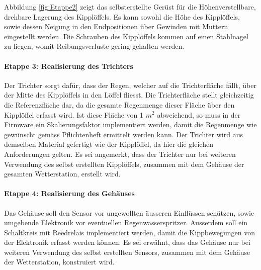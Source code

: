 Abbildung \ref{fig:Etappe2} zeigt das selbsterstellte Gerüst für die Höhenverstellbare, drehbare Lagerung des Kipplöffels. Es kann sowohl die Höhe des Kipplöffels, sowie dessen Neigung in den Endpositionen über Gewinden mit Muttern eingestellt werden. Die Schrauben des Kipplöffels kommen auf einen Stahlnagel zu liegen, womit Reibungsverluste gering gehalten werden.

\paragraph{\textbf{Etappe 3: Realisierung des Trichters}}
Der Trichter sorgt dafür, dass der Regen, welcher auf die Trichterfläche fällt, über der Mitte des Kipplöffels in den Löffel fliesst. Die Trichterfläche stellt gleichzeitig die Referenzfläche dar, da die gesamte Regenmenge dieser Fläche über den Kipplöffel erfasst wird. Ist diese Fläche von 1 $m^2$ abweichend, so muss in der Firmware ein Skalierungsfaktor implementiert werden, damit die Regenmenge wie gewünscht gemäss Pflichtenheft ermittelt werden kann. Der Trichter wird aus demselben Material gefertigt wie der Kipplöffel, da hier die gleichen Anforderungen gelten. Es sei angemerkt, dass der Trichter nur bei weiteren Verwendung des selbst erstellten Kipplöffels, zusammen mit dem Gehäuse der gesamten Wetterstation, erstellt wird.

\paragraph{\textbf{Etappe 4: Realisierung des Gehäuses}}
Das Gehäuse soll den Sensor vor ungewollten äusseren Einflüssen schützen, sowie umgebende Elektronik vor eventuellen Regenwasserspritzer. Ausserdem soll ein Schaltkreis mit Reedrelais implementiert werden, damit die Kippbewegungen von der Elektronik erfasst werden können. Es sei erwähnt, dass das Gehäuse nur bei weiteren Verwendung des selbst erstellten Sensors, zusammen mit dem Gehäuse der Wetterstation, konstruiert wird.

